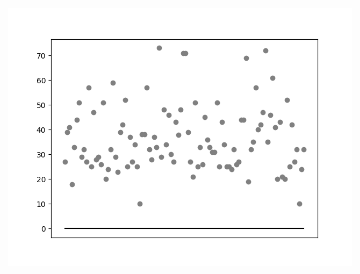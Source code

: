 \begin{figure}[hb!]
\begin{subfigure}[hb]{0.5\linewidth}
		 \includegraphics[width=\linewidth]{img/graficos/reta0/lenet/fig-reta-0-image-treat-2-lenet-lrelu.png}
		\end{subfigure}%
	\end{figure}

